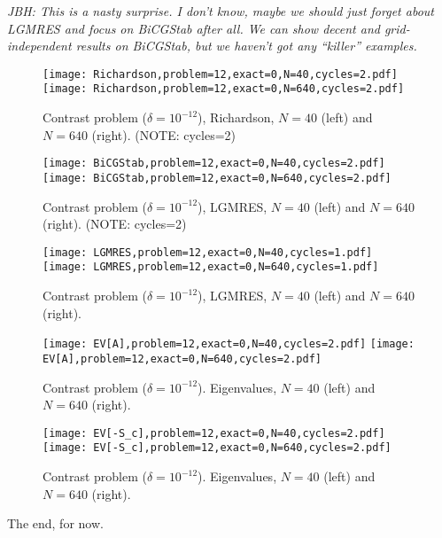 \documentclass{article}
\begin{document}
\emph{JBH: This is a nasty surprise. I don't know, maybe we should just forget about LGMRES and focus on BiCGStab after all. We can show decent and grid-independent results on BiCGStab, but we haven't got any ``killer'' examples.}

\begin{figure}
\begin{center}
\texttt{[image: Richardson,problem=12,exact=0,N=40,cycles=2.pdf]}
\texttt{[image: Richardson,problem=12,exact=0,N=640,cycles=2.pdf]}
\caption{Contrast problem ($\delta=10^{-12}$), Richardson, $N=40$ (left) and $N=640$ (right). (NOTE: cycles=2)}
\label{contrast12-richardson}
\end{center}
\end{figure}

\begin{figure}
\begin{center}
\texttt{[image: BiCGStab,problem=12,exact=0,N=40,cycles=2.pdf]}
\texttt{[image: BiCGStab,problem=12,exact=0,N=640,cycles=2.pdf]}
\caption{Contrast problem ($\delta=10^{-12}$), LGMRES, $N=40$ (left) and $N=640$ (right). (NOTE: cycles=2)}
\label{contrast12-bicgstab}
\end{center}
\end{figure}

\begin{figure}
\begin{center}
\texttt{[image: LGMRES,problem=12,exact=0,N=40,cycles=1.pdf]}
\texttt{[image: LGMRES,problem=12,exact=0,N=640,cycles=1.pdf]}
\caption{Contrast problem ($\delta=10^{-12}$), LGMRES, $N=40$ (left) and $N=640$ (right).}
\label{contrast12-lgmres}
\end{center}
\end{figure}

\begin{figure}
\begin{center}
\texttt{[image: EV[A],problem=12,exact=0,N=40,cycles=2.pdf]}
\texttt{[image: EV[A],problem=12,exact=0,N=640,cycles=2.pdf]}
\caption{Contrast problem ($\delta=10^{-12}$). Eigenvalues, $N=40$ (left) and $N=640$ (right).}
\label{contrast12-evA}
\end{center}
\end{figure}

\begin{figure}
\begin{center}
\texttt{[image: EV[-S\_c],problem=12,exact=0,N=40,cycles=2.pdf]}
\texttt{[image: EV[-S\_c],problem=12,exact=0,N=640,cycles=2.pdf]}
\caption{Contrast problem ($\delta=10^{-12}$). Eigenvalues, $N=40$ (left) and $N=640$ (right).}
\end{center}
\label{contrast12-evS}
\end{figure}

\FloatBarrier

The end, for now.
\end{document}
